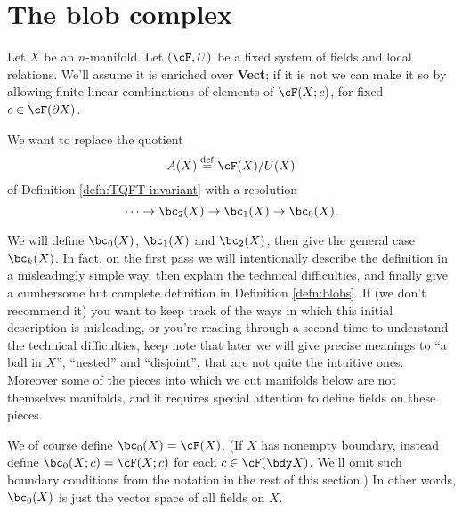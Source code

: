 
\section{The blob complex}
\label{sec:blob-definition}

Let $X$ be an $n$-manifold.
Let $(\cF,U)$ be a fixed system of fields and local relations.
We'll assume it is enriched over \textbf{Vect}; 
if it is not we can make it so by allowing finite
linear combinations of elements of $\cF(X; c)$, for fixed $c\in \cF(\bd X)$.


We want to replace the quotient
\[
	A(X) \deq \cF(X) / U(X)
\]
of Definition \ref{defn:TQFT-invariant} with a resolution
\[
	\cdots \to \bc_2(X) \to \bc_1(X) \to \bc_0(X) .
\]

We will define $\bc_0(X)$, $\bc_1(X)$ and $\bc_2(X)$, then give the general case $\bc_k(X)$. 
In fact, on the first pass we will intentionally describe the definition in a misleadingly simple way, 
then explain the technical difficulties, and finally give a cumbersome but complete definition in 
Definition \ref{defn:blobs}. 
If (we don't recommend it) you want to keep track of the ways in which 
this initial description is misleading, or you're reading through a second time to understand the 
technical difficulties, keep note that later we will give precise meanings to ``a ball in $X$'', 
``nested'' and ``disjoint'', that are not quite the intuitive ones. 
Moreover some of the pieces 
into which we cut manifolds below are not themselves manifolds, and it requires special attention 
to define fields on these pieces.

We of course define $\bc_0(X) = \cF(X)$.
(If $X$ has nonempty boundary, instead define $\bc_0(X; c) = \cF(X; c)$ for each $c \in \cF(\bdy X)$.
We'll omit such boundary conditions from the notation in the rest of this section.)
In other words, $\bc_0(X)$ is just the vector space of all fields on $X$.

